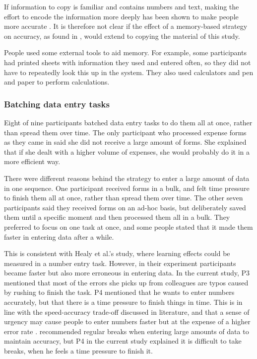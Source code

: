 \documentclass[11pt,oneside]{report}
\begin{document}
If information to copy is familiar and contains numbers and text, making the effort to encode the information more deeply has been shown to make people more accurate \citep{Gray2004, Soboczenski2013}. It is therefore not clear if the effect of a memory-based strategy on accuracy, as found in \citep{Morgan2009}, would extend to copying the material of this study.

People used some external tools to aid memory. For example, some participants had printed sheets with information they used and entered often, so they did not have to repeatedly look this up in the system. They also used calculators and pen and paper to perform calculations.

\subsubsection{Batching data entry tasks}
Eight of nine participants batched data entry tasks to do them all at once, rather than spread them over time. The only participant who processed expense forms as they came in said she did not receive a large amount of forms. She explained that if she dealt with a higher volume of expenses, she would probably do it in a more efficient way.

There were different reasons behind the strategy to enter a large amount of data in one sequence. One participant received forms in a bulk, and felt time pressure to finish them all at once, rather than spread them over time. The other seven participants said they received forms on an ad-hoc basis, but deliberately saved them until a specific moment and then processed them all in a bulk. They preferred to focus on one task at once, and some people stated that it made them faster in entering data after a while. 

This is consistent with Healy et al.'s \citeyearpar{Healy2004} study, where learning effects could be measured in a number entry task. However, in their experiment participants became faster but also more erroneous in entering data. In the current study, P3 mentioned that most of the errors she picks up from colleagues are typos caused by rushing to finish the task. P4 mentioned that he wants to enter numbers accurately, but that there is a time pressure to finish things in time. This is in line with the speed-accuracy trade-off discussed in literature, and that a sense of urgency may cause people to enter numbers faster but at the expense of a higher error rate \citep{Lin2011, Lin2013}.
\citet{Healy2004} recommended regular breaks when entering large amounts of data to maintain accuracy, but P4 in the current study explained it is difficult to take breaks, when he feels a time pressure to finish it.
\end{document}
